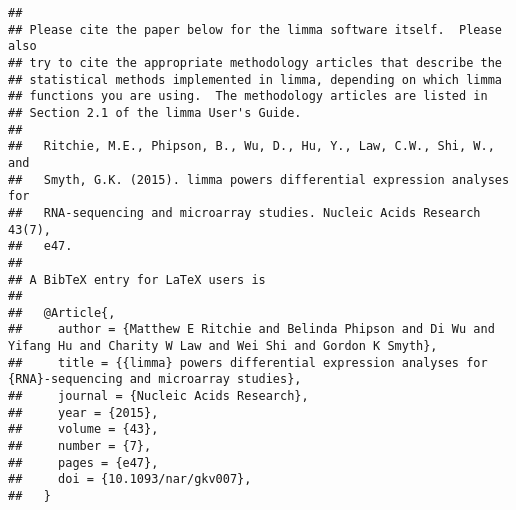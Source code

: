 \documentclass[
]{article}
\begin{document}
\begin{verbatim}
## 
## Please cite the paper below for the limma software itself.  Please also
## try to cite the appropriate methodology articles that describe the
## statistical methods implemented in limma, depending on which limma
## functions you are using.  The methodology articles are listed in
## Section 2.1 of the limma User's Guide.
## 
##   Ritchie, M.E., Phipson, B., Wu, D., Hu, Y., Law, C.W., Shi, W., and
##   Smyth, G.K. (2015). limma powers differential expression analyses for
##   RNA-sequencing and microarray studies. Nucleic Acids Research 43(7),
##   e47.
## 
## A BibTeX entry for LaTeX users is
## 
##   @Article{,
##     author = {Matthew E Ritchie and Belinda Phipson and Di Wu and Yifang Hu and Charity W Law and Wei Shi and Gordon K Smyth},
##     title = {{limma} powers differential expression analyses for {RNA}-sequencing and microarray studies},
##     journal = {Nucleic Acids Research},
##     year = {2015},
##     volume = {43},
##     number = {7},
##     pages = {e47},
##     doi = {10.1093/nar/gkv007},
##   }
\end{verbatim}
\end{document}
